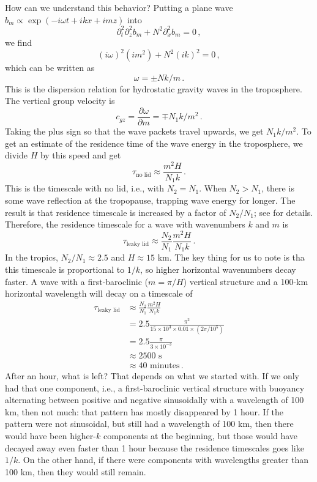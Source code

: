 \documentclass[12pt]{article}
\begin{document}
How can we understand this behavior?  Putting a plane wave $b_m \propto \exp(-i\omega t + ikx + imz)$ into
\[
\partial_t^2 \partial_z^2 b_m + N^2 \partial_x^2 b_m = 0 \, ,
\]
we find
\[
(i\omega)^2 (im^2)+ N^2 (ik)^2 = 0 \, ,
\]
which can be written as
\[
\omega = \pm N k/m \, .
\]
This is the dispersion relation for hydrostatic gravity waves in the troposphere.  The vertical group velocity is
\[
c_{gz} = \frac{\partial \omega}{\partial m} = \mp N_1 k/m^2 \, .
\]
Taking the plus sign so that the wave packets travel upwards, we get $N_1k/m^2$.  To get an estimate of the residence time of the wave energy in the troposphere, we divide $H$ by this speed and get
\[
\tau_{\text{no lid}} \approx \frac{m^2 H}{N_1 k} \, .
\]
This is the timescale with no lid, i.e., with $N_2 = N_1$.  When $N_2 > N_1$, there is some wave reflection at the tropopause, trapping wave energy for longer.  The result is that residence timescale is increased by a factor of $N_2/N_1$; see \citet{15leaky} for details.  Therefore, the residence timescale for a wave with wavenumbers $k$ and $m$ is
\[
\tau_{\text{leaky lid}} \approx \frac{N_2}{N_1} \frac{m^2 H}{N_1 k} \, .
\]
In the tropics, $N_2/N_1 \approx 2.5$ and $H \approx 15$ km.  The key thing for us to note is tha this timescale is proportional to $1/k$, so higher horizontal wavenumbers decay faster.  A wave with a first-baroclinic ($m = \pi/H$) vertical structure and a 100-km horizontal wavelength will decay on a timescale of
\begin{align}
\tau_{\text{leaky lid}} &\approx \frac{N_2}{N_1} \frac{m^2 H}{N_1 k} \\
&= 2.5 \frac{\pi^2}{15 \times 10^3 \times 0.01 \times (2\pi/10^5)} \\
&= 2.5 \frac{\pi}{3 \times 10^{-3}} \\
&\approx 2500 \text{ s} \\
&\approx 40 \text{ minutes} \, .
\end{align}
After an hour, what is left?  That depends on what we started with.  If we only had that one component, i.e., a first-baroclinic vertical structure with buoyancy alternating between positive and negative sinusoidally with a wavelength of 100 km, then not much: that pattern has mostly disappeared by 1 hour.  If the pattern were not sinusoidal, but still had a wavelength of 100 km, then there would have been higher-$k$ components at the beginning, but those would have decayed away even faster than 1 hour because the residence timescales goes like $1/k$.  On the other hand, if there were components with wavelengths greater than 100 km, then they would still remain.
\end{document}
